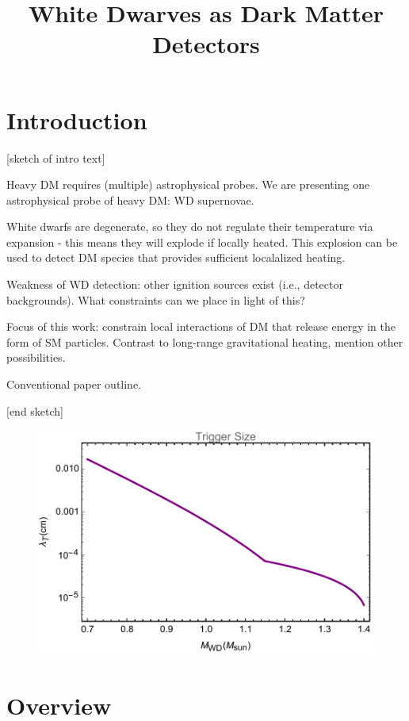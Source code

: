 \documentclass[twocolumn,showpacs,preprintnumbers,amsmath,amssymb,prl]{revtex4}
\begin{document}
\title{White Dwarves as Dark Matter Detectors}
\maketitle
\section{Introduction}

{\color{blue} [sketch of intro text]

Heavy DM requires (multiple) astrophysical probes.
We are presenting one astrophysical probe of heavy DM: WD supernovae. 

White dwarfs are degenerate, so they do not regulate their temperature via expansion - this means they will explode if locally heated.  This explosion can be used to detect DM species that provides sufficient localalized heating. 

Weakness of WD detection: other ignition sources exist (i.e., detector backgrounds). What constraints can we place in light of this?

Focus of this work: constrain local interactions of DM that release energy in the form of SM particles. Contrast to long-range gravitational heating, mention other possibilities. 

Conventional paper outline. 

[end sketch]}

\begin{figure}
\includegraphics[scale=.45]{triggerboom.pdf}
\end{figure}

\section{Overview}
\end{document}
